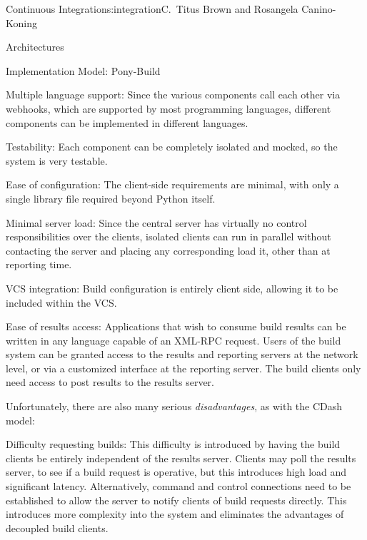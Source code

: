 \begin{aosachapter}{Continuous Integration}{s:integration}{C.\ Titus Brown and Rosangela Canino-Koning}
\begin{aosasect1}{Architectures}
\begin{aosasect2}{Implementation Model: Pony-Build}
\begin{aosadescription}
  \item{Multiple language support:} Since the various components
  call each other via webhooks, which are supported by most
  programming languages, different components can be implemented in
  different languages.

  \item{Testability:} Each component can be completely isolated
  and mocked, so the system is very testable.

  \item{Ease of configuration:} The client-side requirements are
  minimal, with only a single library file required beyond Python
  itself.

  \item{Minimal server load:} Since the central server has
  virtually no control responsibilities over the clients, isolated
  clients can run in parallel without contacting the server and
  placing any corresponding load it, other than at reporting time.

  \item{VCS integration:} Build configuration is entirely client
  side, allowing it to be included within the VCS.

  \item{Ease of results access:} Applications that wish to
  consume build results can be written in any language capable of an
  XML-RPC request. Users of the build system can be granted access
  to the results and reporting servers at the network level, or via
  a customized interface at the reporting server. The build clients
  only need access to post results to the results server.

\end{aosadescription}

Unfortunately, there are also many serious \emph{disadvantages}, as
with the CDash model:

\begin{aosadescription}

  \item{Difficulty requesting builds:} This difficulty is
  introduced by having the build clients be entirely independent of
  the results server. Clients may poll the results server, to see if
  a build request is operative, but this introduces high load and
  significant latency. Alternatively, command and control
  connections need to be established to allow the server to notify
  clients of build requests directly. This introduces more
  complexity into the system and eliminates the advantages of
  decoupled build clients.


\end{aosadescription}
\end{aosasect2}
\end{aosasect1}
\end{aosachapter}
